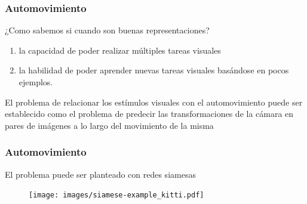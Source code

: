 \documentclass{beamer}
\begin{document}
\begin{frame}[plain]
\frametitle{Automovimiento}

¿Como sabemos si cuando son buenas representaciones?\\\pause

\vfill
\begin{enumerate}
    \item la capacidad de poder realizar múltiples tareas visuales
    \item la habilidad de poder aprender nuevas tareas visuales basándose en pocos ejemplos.
\end{enumerate}\pause
\vfill

\begin{block}{}
El problema de relacionar los estímulos visuales con el automovimiento puede ser establecido como el problema de predecir las transformaciones de la cámara en pares de imágenes a lo largo del movimiento de la misma
\end{block}
\vfill
\end{frame}




\begin{frame}[plain]
\frametitle{Automovimiento}
El problema puede ser planteado con redes siamesas\\
\vfill
\begin{figure}
    \centering
    \texttt{[image: images/siamese-example\_kitti.pdf]}
\end{figure}
\vfill
\end{frame}
\end{document}
